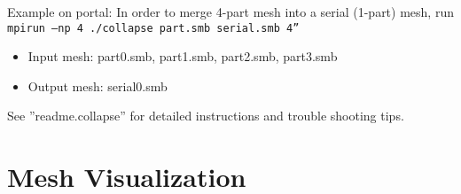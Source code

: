 Example on portal:
\newline
In order to merge 4-part mesh into a serial (1-part) mesh, run
\texttt{mpirun –np 4 ./collapse part.smb serial.smb 4”
}
\begin{itemize}
\item	Input mesh: part0.smb, part1.smb, part2.smb, part3.smb
\item	Output mesh: serial0.smb
\end{itemize}

See ”readme.collapse” for detailed instructions and trouble shooting tips.


\section{Mesh Visualization}
